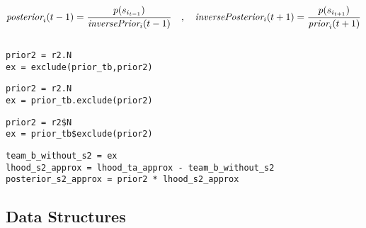 \documentclass[article]{jss}
\newif\ifen
\newif\ifes
\newcommand{\en}[1]{\ifen#1\fi}
\newcommand{\es}[1]{\ifes#1\fi}
\begin{document}
\es{Los mensajes que no est\'an todav\'ia definidos, por ejemplo el prior inverso en la primer pasada hacia adelante, es remplazado por una forma neutral como un escalar unidad o una distribuci\'on gausiana con infinita varianza.}
%
\en{Finally, the messages that the variable $s_{i_t}$ sends to the past and the future are,}
\es{Finalmente, los mensajes que la variable $s_{i_t}$ env\'ia al pasado y al futuro son,}
%
\begin{equation*}
  \emph{posterior}_i(t-1) = \frac{p(s_{i_{t-1}})}{\emph{inversePrior}_i(t-1)} \ \ \ , \ \ \ \emph{inversePosterior}_i(t+1) = \frac{p(s_{i_{t+1}})}{\emph{prior}_i(t+1)}
\end{equation*}



%

\begin{lstlisting}[backgroundcolor=\color
{white},label=lst:posterior_s2_approx, caption=\relax, belowskip=-1.0 \baselineskip, aboveskip=-0 \baselineskip]
\end{lstlisting}
\begin{paracol}{3}
\begin{lstlisting}[backgroundcolor=\color{julia},belowskip=-0.77 \baselineskip]
prior2 = r2.N
ex = exclude(prior_tb,prior2)
\end{lstlisting}
\switchcolumn
\begin{lstlisting}[backgroundcolor=\color{python},belowskip=-0.77 \baselineskip]
prior2 = r2.N
ex = prior_tb.exclude(prior2)
\end{lstlisting}
\switchcolumn
\begin{lstlisting}[backgroundcolor=\color{r},belowskip=-0.77 \baselineskip]
prior2 = r2$N
ex = prior_tb$exclude(prior2)
\end{lstlisting}
\end{paracol}
\begin{lstlisting}[backgroundcolor=\color{all}]
team_b_without_s2 = ex
lhood_s2_approx = lhood_ta_approx - team_b_without_s2 
posterior_s2_approx = prior2 * lhood_s2_approx 
\end{lstlisting}

\en{At each forward pass we store each forward message, i.e. \emph{prior}$_i(t+1)$.}
\es{En cada pasada hacia adelante, guardamos cada mensaje hacia adelante, i.e. \emph{prior}$_i(t+1)$.}
%
\en{And at each backward pass we compute the backward message, i.e. \emph{inversePrior}$_i(t-1)$.}
\es{En cada pasada hacia atr\'as computamos el mensaje hacia atr\'as, i.e. \emph{inversePrior}$_i(t-1)$.}
%
\subsection{Data Structures} \label{sec:estructuras} 
\end{document}
